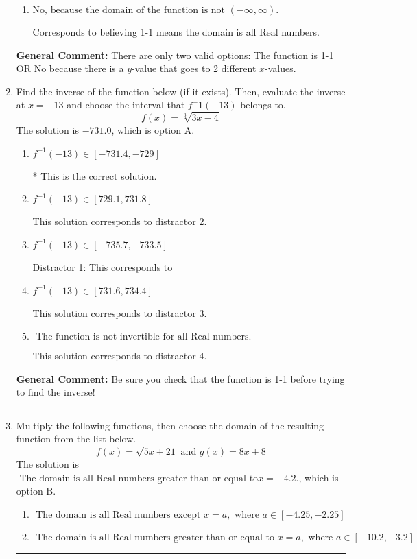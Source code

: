 \documentclass{extbook}[14pt]
\newcommand{\litem}[1]{\item #1

\rule{\textwidth}{0.4pt}}
\begin{document}
\begin{enumerate}
{\begin{enumerate}[label=\Alph*.]
Corresponds to believing 1-1 means the range is all Real numbers.
\item \( \text{No, because the domain of the function is not $(-\infty, \infty)$.} \)

Corresponds to believing 1-1 means the domain is all Real numbers.
\end{enumerate}

\textbf{General Comment:} There are only two valid options: The function is 1-1 OR No because there is a $y$-value that goes to 2 different $x$-values.
}
\litem{
Find the inverse of the function below (if it exists). Then, evaluate the inverse at $x = -13$ and choose the interval that $f^-1(-13)$ belongs to.
\[ f(x) = \sqrt[3]{3 x - 4} \]The solution is \( -731.0 \), which is option A.\begin{enumerate}[label=\Alph*.]
\item \( f^{-1}(-13) \in [-731.4, -729] \)

* This is the correct solution.
\item \( f^{-1}(-13) \in [729.1, 731.8] \)

 This solution corresponds to distractor 2.
\item \( f^{-1}(-13) \in [-735.7, -733.5] \)

 Distractor 1: This corresponds to 
\item \( f^{-1}(-13) \in [731.6, 734.4] \)

 This solution corresponds to distractor 3.
\item \( \text{ The function is not invertible for all Real numbers. } \)

 This solution corresponds to distractor 4.
\end{enumerate}

\textbf{General Comment:} Be sure you check that the function is 1-1 before trying to find the inverse!
}
\litem{
Multiply the following functions, then choose the domain of the resulting function from the list below.
\[ f(x) = \sqrt{5x+21}  \text{ and } g(x) = 8x + 8 \]The solution is \( \text{ The domain is all Real numbers greater than or equal to} x = -4.2. \), which is option B.\begin{enumerate}[label=\Alph*.]
\item \( \text{ The domain is all Real numbers except } x = a, \text{ where } a \in [-4.25, -2.25] \)


\item \( \text{ The domain is all Real numbers greater than or equal to } x = a, \text{ where } a \in [-10.2, -3.2] \)



\end{enumerate}}
\end{enumerate}
\end{document}
